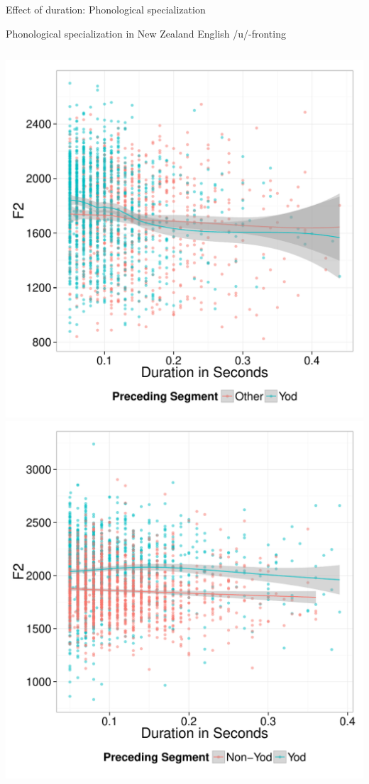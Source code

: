 \documentclass[hyperref={pdfpagelabels=false}]{beamer}
\begin{document}
\begin{frame}{Effect of duration: Phonological specialization}
	\begin{block}{Phonological specialization in New Zealand English /u/-fronting}
	\begin{columns}[c]
	\includegraphics[trim=2cm 2cm 2cm 2cm, clip=false, width=.7\textwidth]{GooseNewOldDur.pdf}
	\includegraphics[trim=2cm 2cm 2cm 2cm, clip=false, width=.7\textwidth]{GooseNewYoungDur.pdf}
	\end{columns}
	\end{block}	
\end{frame}
\end{document}
